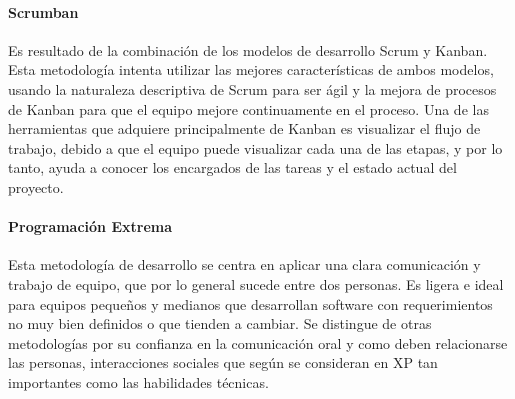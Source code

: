 \paragraph{Scrumban} Es resultado de la combinación de los modelos de desarrollo Scrum y Kanban. Esta metodología intenta utilizar las mejores características de ambos modelos, usando la naturaleza descriptiva de Scrum para ser ágil y la mejora de procesos de Kanban para que el equipo mejore continuamente en el proceso. Una de las herramientas que adquiere principalmente de Kanban es visualizar el flujo de trabajo, debido a que el equipo puede visualizar cada una de las etapas, y por lo tanto, ayuda a conocer los encargados de las tareas y el estado actual del proyecto.

\paragraph{Programación Extrema} Esta metodología de desarrollo se centra en aplicar una clara comunicación y trabajo de equipo, que por lo general sucede entre dos personas. Es ligera e ideal para equipos pequeños y medianos que desarrollan software con requerimientos no muy bien definidos o que tienden a cambiar. Se distingue de otras metodologías por su confianza en la comunicación oral y como deben relacionarse las personas, interacciones sociales que según \textcite{Beck2004} se consideran en XP tan importantes como las habilidades técnicas.

